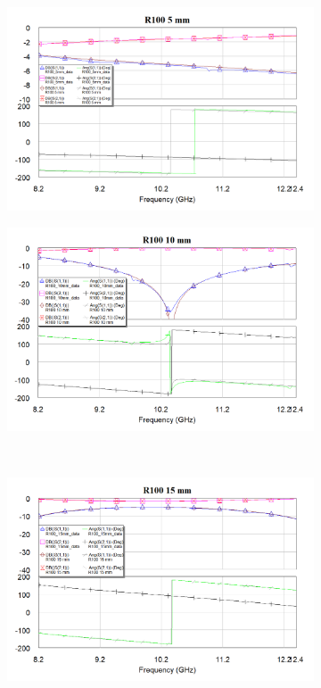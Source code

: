 \documentclass[11pt,a4paper]{article}
\begin{document}
\begin{figure}[!ht]
    \centering
\begin{subfigure}{0.45\textwidth}
    \centering
    \includegraphics[width=\textwidth]{src/r100-5mm.png}
\end{subfigure}
\begin{subfigure}{0.45\textwidth}
    \centering
    \includegraphics[width=\textwidth]{src/r100-10mm.png}
\end{subfigure}\\
\begin{subfigure}{0.45\textwidth}
    \centering
    \includegraphics[width=\textwidth]{src/r100-15mm.png}

\end{subfigure}
\end{figure}
\end{document}
